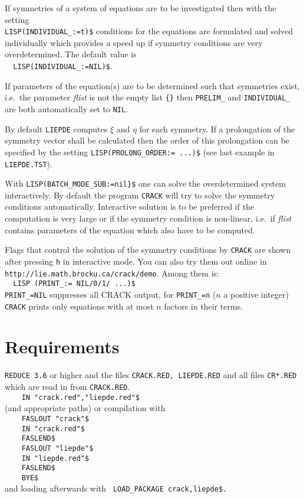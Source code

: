 \documentclass[12pt]{article}
\begin{document}
If symmetries of a system of equations are to be investigated 
then with the setting \\
\verb+LISP(INDIVIDUAL_:=t)$+ conditions for the equations are formulated 
and solved individually which provides a speed up if symmetry conditions are
very overdetermined. The default value is \\ 
\verb+  LISP(INDIVIDUAL_:=NIL)$+. 

If parameters of the equation(s) are to be determined such that
symmetries exist, i.e.\ the parameter {\it flist} is not the empty
list \verb+{}+ then {\tt PRELIM\_} and {\tt INDIVIDUAL\_} are both
automatically set to {\tt NIL}.

By default {\tt LIEPDE} computes $\xi$ and $\eta$ for each
symmetry. If a prolongation of the symmetry vector shall be calculated
then the order of this prolongation can be specified by the setting 
\verb+LISP(PROLONG_ORDER:= ...)$+ (see last example in {\tt LIEPDE.TST}). 

With \verb+LISP(BATCH_MODE_SUB:=nil}$+ one can solve the overdetermined system 
interactively. By default the program {\tt CRACK} will try to solve the
symmetry conditions automatically. Interactive solution is to be preferred if
the computation is very large or if the symmetry condition is non-linear, 
i.e.\ if {\it flist} contains parameters of the equation which also have 
to be computed.

Flags that control the solution of the symmetry conditions by {\tt CRACK}
are shown after pressing {\tt h} in interactive mode. You can also 
try them out online in \\ \verb+http://lie.math.brocku.ca/crack/demo+.
Among them is: \\
\verb+  LISP (PRINT_:= NIL/0/1/ ...)$+ \\
\verb+PRINT_=NIL+ suppresses all CRACK output, for \verb+PRINT_=n+ 
($n$ a positive integer) 
{\tt CRACK} prints only equations with at most $n$ factors in their terms.


\section{Requirements}

{\tt REDUCE 3.6} or higher and 
the files {\tt CRACK.RED, LIEPDE.RED} and 
all files {\tt CR*.RED} which are read in from {\tt CRACK.RED}. \\
\verb+    IN "crack.red","liepde.red"$+ \\
(and appropriate paths) or compilation with \\
\verb+    FASLOUT "crack"$+ \\
\verb+    IN "crack.red"$+ \\
\verb+    FASLEND$+ \\
\verb+    FASLOUT "liepde"$+ \\
\verb+    IN "liepde.red"$+ \\
\verb+    FASLEND$+ \\
\verb+    BYE$+ \\
and loading afterwards with \verb+ LOAD_PACKAGE crack,liepde$.+
\end{document}

